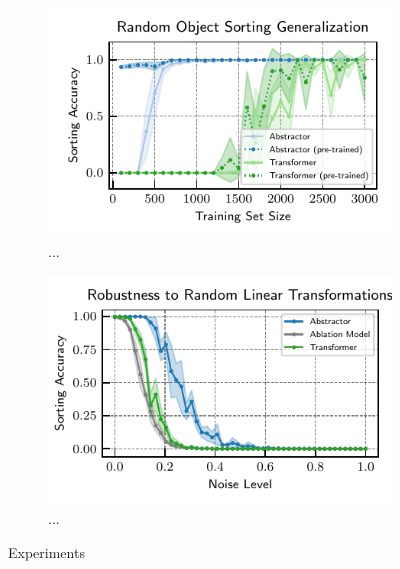 \begin{figure}
    \bigskip
    \begin{subfigure}[t]{0.45\textwidth}
        \centering
        \includegraphics{figures/experiments/random_object_sorting_generalization.pdf}
        \caption{...}\label{fig:object_sorting_generalization}
    \end{subfigure} \hspace{\fill}
    \begin{subfigure}[t]{0.45\textwidth}
        \centering
        \includegraphics{figures/experiments/multiplicative_robustness.pdf}
        \caption{...}\label{fig:robustness}
    \end{subfigure}
    \caption{Experiments}\label{fig:experiments}
\end{figure}


